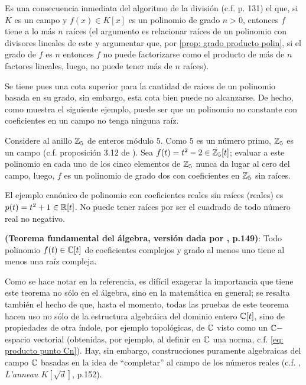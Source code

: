 Es una consecuencia inmediata del algoritmo de la división
(c.f. \cite{rotman} p. 131) el que, si $K$ es un campo
y $f(x) \in K[x]$ es un polinomio de grado $n>0$, 
entonces $f$ tiene a lo más $n$ raíces (el argumento es
relacionar raíces de un polinomio con divisores lineales
de este y argumentar que, por 
\ref{prop: grado producto polin}, 
si el grado de $f$
es $n$ entonces $f$ no puede factorizarse como el producto
de más de $n$ factores lineales, luego, no puede tener más de 
$n$ raíces).

Se tiene pues una cota superior para la cantidad
de raíces de un polinomio basada en 
su grado, sin embargo, esta cota bien puede no
alcanzarse. De hecho, como muestra el siguiente ejemplo,
puede ser que un polinomio no constante con coeficientes en un campo
no tenga ninguna raíz.

\begin{ejemplo}
Considere al anillo $\mathbb{Z}_{5}$ de enteros módulo $5$. Como
$5$ es un número primo, $\mathbb{Z}_{5}$ es un campo (c.f. proposición
3.12 de \cite{rotman}).
Sea $f(t)=t^{2}-2 \in \mathbb{Z}_{5}[t]$; evaluar a este polinomio
en cada uno de los cinco elementos de $\mathbb{Z}_{5}$
nunca da lugar al cero del campo, luego, $f$ es un polinomio
de grado dos con coeficientes en $\mathbb{Z}_{5}$ sin raíces.
\final
\end{ejemplo}

\begin{ejemplo}
El ejemplo canónico de polinomio con coeficientes reales
sin raíces (reales) es $p(t)=t^{2}+1 \in \mathbb{R}[t]$. 
No puede tener raíces por
ser el cuadrado de todo número real no negativo. 
\final 
\end{ejemplo}



\begin{teo}
\label{teo: fundamental del algebra}
\textbf{(Teorema fundamental del álgebra, 
versión dada por \cite{kurosch}, p.149)}:
Todo polinomio
$f(t) \in \mathbb{C}[t]$ de coeficientes complejos
y grado al menos uno
tiene al menos una raíz compleja.
\end{teo}

Como se hace notar en la referencia, es difícil exagerar
la importancia que tiene este teorema no sólo en el álgebra, 
sino en la matemática en general; se resalta también el hecho
de que, hasta el momento, todas las pruebas de este teorema
hacen uso no sólo de la estructura algebráica del dominio entero
$\mathbb{C}[t]$, sino de propiedades
de otra índole, por ejemplo
topológicas, de
$\mathbb{C}$ visto como un $\mathbb{C}-$espacio vectorial
(obtenidas, por ejemplo, al definir en $\mathbb{C}$ una norma, c.f.
\eqref{eq: producto punto Cn}).
Hay, sin embargo, construcciones puramente algebraicas
del campo $\mathbb{C}$ basadas en la idea de ``completar'' al campo
de los números reales (c.f. \cite{godement}, 
\textit{L'anneau $K[\sqrt{d}]$}, p.152).


